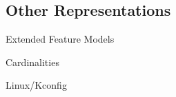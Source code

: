 
\subsection{Other Representations} %

\begin{frame}{\insertsubsection}
	Extended Feature Models
	

	Cardinalities

	Linux/Kconfig %
\end{frame}








